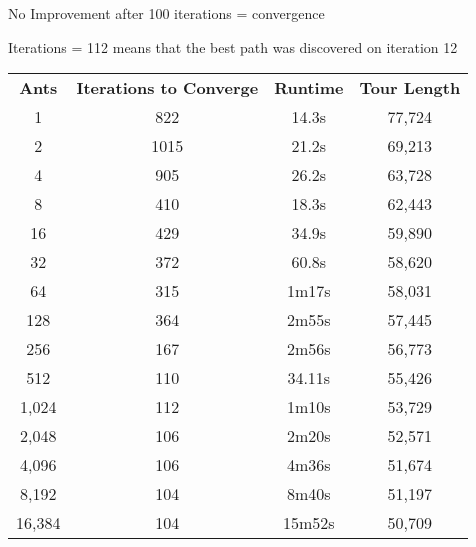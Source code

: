 \documentclass[a4paper, 11pt,table]{article}
\begin{document}
	\begin{center}
		No Improvement after 100 iterations = convergence
		
		Iterations = 112 means that the best path was discovered on iteration 12
		
		\begin{tabu}{|c c c c|}
			\textbf{Ants} & \textbf{Iterations to Converge} & \textbf{Runtime} & \textbf{Tour Length} \\
			1             & 822                             & 14.3s            & 77,724               \\
			2             & 1015                            & 21.2s            & 69,213               \\
			4             & 905                             & 26.2s            & 63,728               \\
			8             & 410                             & 18.3s            & 62,443               \\
			16            & 429                             & 34.9s            & 59,890               \\
			32            & 372                             & 60.8s            & 58,620               \\
			64            & 315                             & 1m17s            & 58,031               \\
			128           & 364                             & 2m55s            & 57,445               \\
			256           & 167                             & 2m56s            & 56,773               \\
			512           & 110                             & 34.11s           & 55,426               \\
			1,024         & 112                             & 1m10s            & 53,729               \\
			2,048         & 106                             & 2m20s            & 52,571               \\
			4,096         & 106                             & 4m36s            & 51,674               \\
			8,192         & 104                             & 8m40s            & 51,197               \\
			16,384        & 104                             & 15m52s           & 50,709               \\
		\end{tabu}
	\end{center}
	
\end{document}

